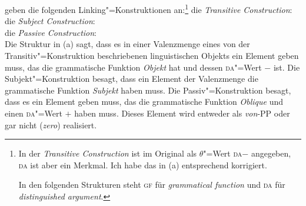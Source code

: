 %
\citet[--57]{MR2001a} geben die folgenden Linking"=Konstruktionen an:\footnote{
  In der \emph{Transitive Construction} ist im Original als $\theta$"=Wert \textsc{da}$-$
  angegeben, \textsc{da} ist aber ein Merkmal. Ich habe das in (a) entsprechend korrigiert.

  In den folgenden Strukturen steht \textsc{gf} für \emph{grammatical function} und \textsc{da} für \emph{distinguished argument}.%
}
\eal
\label{linking-konstruktionen}
\ex\label{transitiv-Konstruktion} die \emph{Transitive Construction}:\\
\ex die \emph{Subject Construction}:\\
\label{ex-Subject-Construction-Michaelis}%
\ex die \emph{Passive Construction}:\\
\zl
Die Struktur in (a) sagt, dass es in einer Valenzmenge eines von
der Transitiv"=Konstruktion beschriebenen linguistischen Objekts ein Element geben muss, das die grammatische Funktion
\emph{Objekt} hat und dessen \textsc{da}"=Wert $-$ ist. Die Subjekt"=Konstruktion besagt, dass ein
Element der Valenzmenge die grammatische Funktion \emph{Subjekt} haben muss. Die Passiv"=Konstruktion
besagt, dass es ein Element geben muss, das die grammatische Funktion \emph{Oblique} und einen
\textsc{da}"=Wert $+$ haben muss. Dieses Element wird entweder als \emph{von}-PP oder gar nicht (\emph{zero})
realisiert.

